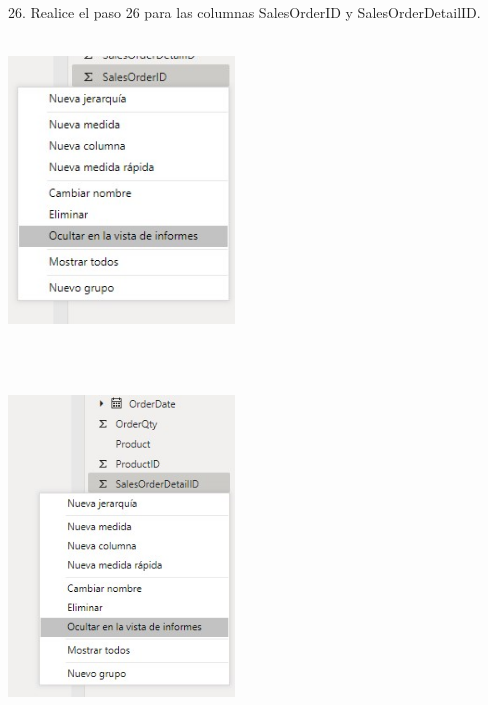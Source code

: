 \documentclass[12pt,letterpaper]{article}
\begin{document}
\begin{flushleft}
\begin{itemize}
26. Realice el paso 26 para las columnas SalesOrderID y SalesOrderDetailID.\\

\textbf{ }\\
\begin{center}
	\includegraphics[width=6cm]{./Imagenes/image21} 
	\end{center}
\textbf{ }\\
\textbf{ }\\
\begin{center}
	\includegraphics[width=6cm]{./Imagenes/image22} 
	\end{center}
\textbf{ }\\

\textbf{ }\\
\textbf{ }\\
\textbf{ }\\
\textbf{ }\\
\textbf{ }\\
\textbf{ }\\
\textbf{ }\\
\textbf{ }\\
\textbf{ }\\
\textbf{ }\\
\textbf{ }\\


\end{itemize}
\end{flushleft}
\end{document}
